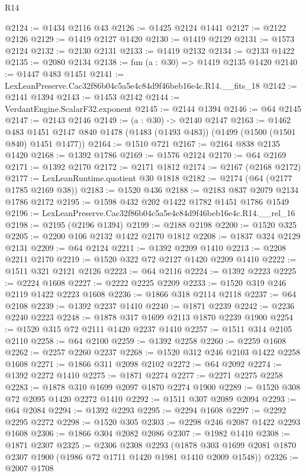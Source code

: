 \begin{lexlean}{R14}
\begin{coremodule}
@2124 := @1434 @2116 @43
@2126 := @1425 @2124 @1441
@2127 := @2122 @2126
@2129 := @1419 @2127 @1420
@2130 := @1419 @2129
@2131 := @1573 @2124
@2132 := @2130 @2131
@2133 := @1419 @2132
@2134 := @2133 @1422
@2135 := @2080 @2134
@2138 := fun (a : @30) => @1419 @2135 @1420
@2140 := @1447 @483 @1451
@2141 := LexLeanPreserve.Cac32f86b04c5a5e4c84d9f46beb16e4c.R14.__fits_18
@2142 := @2141 @1394
@2143 := @1453 @2142
@2144 := VerdantEngine.ScalarF32.exponent
@2145 := @2144 @1394
@2146 := @64 @2145
@2147 := @2143 @2146
@2149 := (a : @30) -> @2140 @2147
@2163 := @1462
    @483
    @1451
    @2147
    @840
    @1478
    (@1483 (@1493 @483))
    (@1499 (@1500 (@1501 @840) @1451 @1477))
@2164 := @1510 @721
@2167 := @2164 @838 @2135 @1420
@2168 := @1392 @1786
@2169 := @1576 @2124
@2170 := @64 @2169
@2171 := @1392 @2170
@2172 := @2171 @1812
@2174 := @2167 (@2168 @2172)
@2177 := LexLeanRuntime.quotient @30 @1818
@2182 := @2174 (@64 (@2177 @1785 @2169 @38))
@2183 := @1520 @436
@2188 := @2183 @837 @2079 @2134 @1786 @2172
@2195 := @1598 @432 @202 @1422 @1782 @1451 @1786 @1549
@2196 := LexLeanPreserve.Cac32f86b04c5a5e4c84d9f46beb16e4c.R14.__rel_16
@2198 := @2195 (@2196 @1394)
@2199 := @2188 @2198
@2200 := @1520 @325
@2205 := @2200 @106 @2132 @1422 @2170 @1812
@2208 := @1837 @324 @2129 @2131
@2209 := @64 @2124
@2211 := @1392 @2209 @1410
@2213 := @2208 @2211 @2170
@2219 := @1520 @322 @72 @2127 @1420 @2209 @1410
@2222 := @1511 @321 @2121 @2126
@2223 := @64 @2116
@2224 := @1392 @2223
@2225 := @2224 @1608
@2227 := @2222 @2225 @2209
@2233 := @1520 @319 @246 @2119 @1422 @2223 @1608
@2236 := @1866 @318 @2114 @2118
@2237 := @64 @2108
@2239 := @1392 @2237 @1410
@2240 := @1871 @2239
@2242 := @2236 @2240 @2223
@2248 := @1878 @317 @1699 @2113 @1870 @2239 @1900
@2254 := @1520 @315 @72 @2111 @1420 @2237 @1410
@2257 := @1511 @314 @2105 @2110
@2258 := @64 @2100
@2259 := @1392 @2258
@2260 := @2259 @1608
@2262 := @2257 @2260 @2237
@2268 := @1520 @312 @246 @2103 @1422 @2258 @1608
@2271 := @1866 @311 @2098 @2102
@2272 := @64 @2092
@2274 := @1392 @2272 @1410
@2275 := @1871 @2274
@2277 := @2271 @2275 @2258
@2283 := @1878 @310 @1699 @2097 @1870 @2274 @1900
@2289 := @1520 @308 @72 @2095 @1420 @2272 @1410
@2292 := @1511 @307 @2089 @2094
@2293 := @64 @2084
@2294 := @1392 @2293
@2295 := @2294 @1608
@2297 := @2292 @2295 @2272
@2298 := @1520 @305
@2303 := @2298 @246 @2087 @1422 @2293 @1608
@2306 := @1866 @304 @2082 @2086
@2307 := @1982 @1410
@2308 := @1871 @2307
@2325 := @2306
    @2308
    @2293
    (@1878 @303 @1699 @2081 @1870 @2307 @1900 (@1986 @72 @1711 @1420 @1981 @1410 @2009 @1548))
@2326 := @2007 @1708

\end{coremodule}
\end{lexlean}
